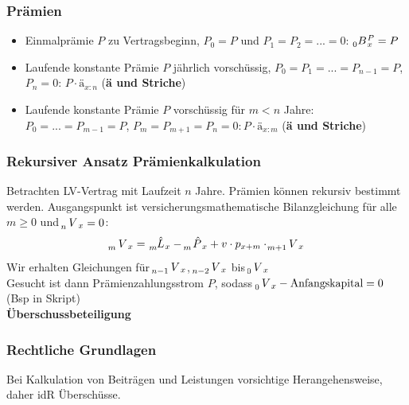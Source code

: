 \documentclass[12pt]{report}
\theoremstyle{dotless}
\theoremstyle{definition}
\begin{document}
\subsubsection{Prämien}
\begin{itemize}
\item Einmalprämie $P$ zu Vertragsbeginn, $P_0=P$ und $P_1=P_2=...=0$: $\tensor[_0]{B}{}_x^P = P$
\item Laufende konstante Prämie $P$ jährlich vorschüssig, $P_0=P_1=...=P_{n-1}=P$, $P_n=0$: $P\cdot ä_{x:n}$ (\textbf{ä und Striche})
\item Laufende konstante Prämie $P$ vorschüssig für $m<n$ Jahre: $P_0=...=P_{m-1}=P$, $P_m=P_{m+1}=P_n=0: P\cdot ä_{x:m}$ (\textbf{ä und Striche})
\end{itemize}

\subsubsection{Rekursiver Ansatz Prämienkalkulation}
Betrachten LV-Vertrag mit Laufzeit $n$ Jahre. Prämien können rekursiv bestimmt werden. Ausgangspunkt ist versicherungsmathematische Bilanzgleichung für alle $m\geq 0$ und $\tensor[_n]{V}{}_x=0$:
\begin{equation}
\tensor[_m]{V}{}_x = \tensor[_m]{\hat{L}}{}_x - \tensor[_m]{\hat{P}}{}_x + v \cdot p_{x+m} \cdot \tensor[_{m+1}]{V}{}_x
\end{equation}
Wir erhalten Gleichungen für $\tensor[_{n-1}]{V}{}_x$, $\tensor[_{n-2}]{V}{}_x$ bis $ \tensor[_0]{V}{}_x$ \\
Gesucht ist dann Prämienzahlungsstrom $P$, sodass $\tensor[_0]{V}{}_x - \text{Anfangskapital} =0$ (Bsp in Skript)\\

\large \textbf{Überschussbeteiligung}
\normalsize 
\subsubsection{Rechtliche Grundlagen}
Bei Kalkulation von Beiträgen und Leistungen vorsichtige Herangehensweise, daher idR Überschüsse.
\end{document}
